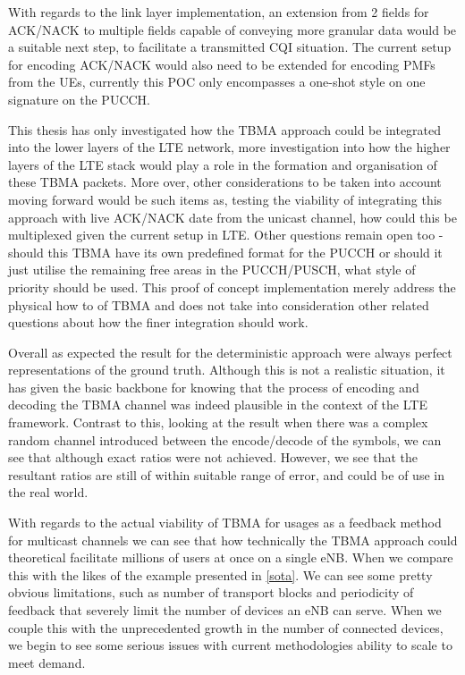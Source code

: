 \documentclass{article}
\begin{document}
With regards to the link layer implementation, an extension from 2 fields for ACK/NACK to multiple fields capable of conveying more granular data would be a suitable next step, to facilitate a transmitted CQI situation. The current setup for encoding ACK/NACK would also need to be extended for encoding PMFs from the UEs, currently this POC only encompasses a one-shot style on one signature on the PUCCH. 

This thesis has only investigated how the TBMA approach could be integrated into the lower layers of the LTE network, more investigation into how the higher layers of the LTE stack would play a role in the formation and organisation of these TBMA packets. More over, other considerations to be taken into account moving forward would be such items as, testing the viability of integrating this approach with live ACK/NACK date from the unicast channel, how could this be multiplexed given the current setup in LTE. Other questions remain open too - should this TBMA have its own predefined format for the PUCCH or should it just utilise the remaining free areas in the PUCCH/PUSCH, what style of priority should be used. This proof of concept implementation merely address the physical how to of TBMA and does not take into consideration other related questions about how the finer integration should work.


Overall as expected the result for the deterministic approach were always perfect representations of the ground truth. Although this is not a realistic situation, it has given the basic backbone for knowing that the process of encoding and decoding the TBMA channel was indeed plausible in the context of the LTE framework. Contrast to this, looking at the result when there was a complex random channel introduced between the encode/decode of the symbols, we can see that although exact ratios were not achieved. However, we see that the resultant ratios are still of within suitable range of error, and could be of use in the real world. 

With regards to the actual viability of \ac{TBMA} for usages as a feedback method for multicast channels we can see that how technically the TBMA approach could theoretical facilitate millions of users at once on a single \ac{eNB}. When we compare this with the likes of the example presented in \cref{sota}. We can see some pretty obvious limitations, such as number of transport blocks and periodicity of feedback that severely limit the number of devices an \ac{eNB} can serve. When we couple this with the unprecedented growth in the number of connected devices, we begin to see some serious issues with current methodologies ability to scale to meet demand. 
\end{document}
